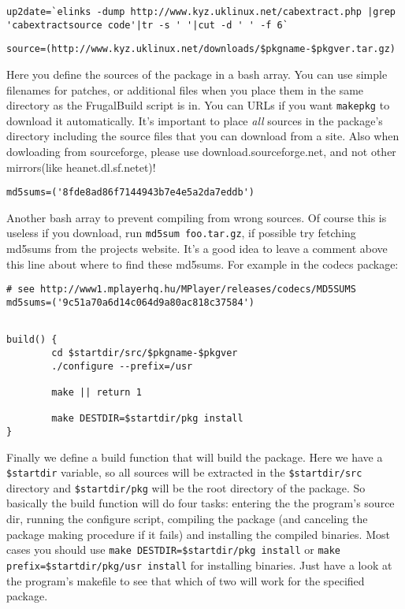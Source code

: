 \begin{verbatim}
up2date=`elinks -dump http://www.kyz.uklinux.net/cabextract.php |grep 'cabextractsource code'|tr -s ' '|cut -d ' ' -f 6`
\end{verbatim}

\begin{verbatim}
source=(http://www.kyz.uklinux.net/downloads/$pkgname-$pkgver.tar.gz)
\end{verbatim}

Here you define the sources of the package in a bash array. You can use simple filenames for patches, or additional files when you place them in the same directory as the FrugalBuild script is in. You can URLs if you want {\tt makepkg} to download it automatically. It's important to place \textit{all} sources in the package's directory including the source files that you can download from a site.
Also when dowloading from sourceforge, please use download.sourceforge.net, and not other mirrors(like
heanet.dl.sf.netet)!

\begin{verbatim}
md5sums=('8fde8ad86f7144943b7e4e5a2da7eddb')
\end{verbatim}

Another bash array to prevent compiling from wrong sources. Of course this is useless if you download, run {\tt md5sum foo.tar.gz}, if possible try fetching md5sums from the projects website. It's a good idea to leave a comment above this line about where to find these md5sums. For example in the codecs package:

\begin{verbatim}
# see http://www1.mplayerhq.hu/MPlayer/releases/codecs/MD5SUMS
md5sums=('9c51a70a6d14c064d9a80ac818c37584')
\end{verbatim}

\begin{verbatim}

build() {
        cd $startdir/src/$pkgname-$pkgver
        ./configure --prefix=/usr
	
        make || return 1
	
        make DESTDIR=$startdir/pkg install
}
\end{verbatim}

Finally we define a build function that will build the package. Here we have a {\tt \$startdir} variable, so all sources will be extracted in the {\tt \$startdir/src} directory and {\tt \$startdir/pkg} will be the root directory of the package. So basically the build function will do four tasks: entering the the program's source dir, running the configure script, compiling the package (and canceling the package making procedure if it fails) and installing the compiled binaries. Most cases you should use {\tt make DESTDIR=\$startdir/pkg install} or {\tt make prefix=\$startdir/pkg/usr install} for installing binaries. Just have a look at the program's makefile to see that which of two will work for the specified package.


